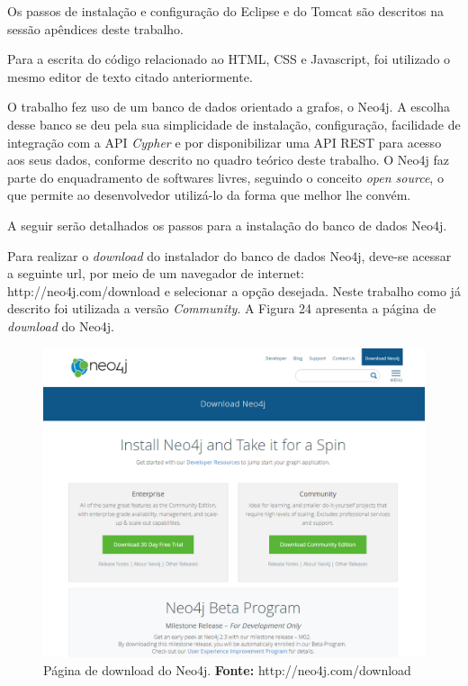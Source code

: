 \par Os passos de instalação e configuração do Eclipse e do Tomcat são descritos na sessão apêndices deste trabalho.

\par Para a escrita do código relacionado ao HTML, CSS e Javascript, foi utilizado o mesmo editor de texto citado anteriormente.

\par O trabalho fez uso de um banco de dados orientado a grafos, o Neo4j. A escolha desse banco se deu pela sua simplicidade de instalação, configuração, facilidade de integração com a API \textit{Cypher} e por disponibilizar uma API REST para acesso aos seus dados, conforme descrito no quadro teórico deste trabalho. O Neo4j faz parte do enquadramento de softwares livres, seguindo o conceito \textit{open source}, o que permite ao desenvolvedor utilizá-lo da forma que melhor lhe convém. 


\par A seguir serão detalhados os passos para a instalação do banco de dados Neo4j.

\par Para realizar o \textit{download} do instalador do banco de dados Neo4j, deve-se acessar a seguinte url, por meio de um  navegador de internet: http://neo4j.com/download e selecionar a opção desejada. Neste trabalho como já descrito foi utilizada a versão \textit{Community}. A Figura 24 apresenta a página de \textit{download} do Neo4j.

\newpage
\begin{figure}[h!]
	\centerline{\includegraphics[scale=0.4]{./imagens/download-neo4j.png}}
	\caption[Página de download do Neo4j]
	{Página de download do Neo4j. \textbf{Fonte:} http://neo4j.com/download}
	\label{fig:exemplo1}
\end{figure}

